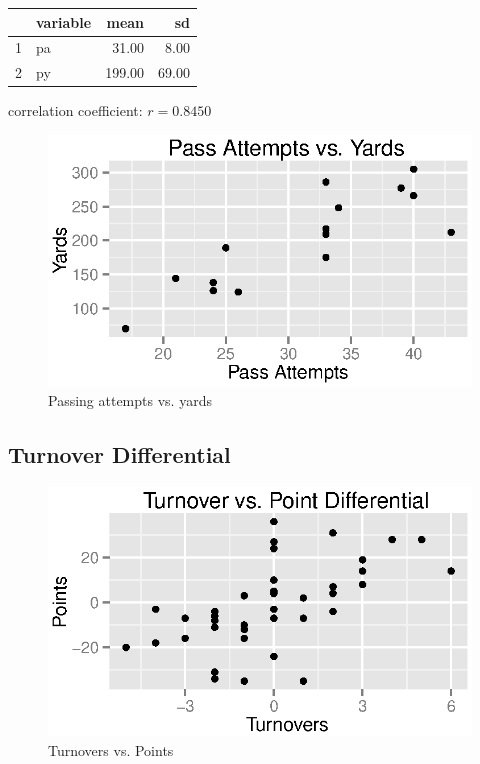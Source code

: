 \documentclass{exam}
\begin{document}
  \begin{table}[ht]
    \centering
    \begin{tabular}{rlrr}
      \toprule
        & variable & mean   & sd \\
      \midrule
      1 & pa       & 31.00  & 8.00 \\
      2 & py       & 199.00 & 69.00 \\
      \bottomrule
    \end{tabular}
  \end{table}

  correlation coefficient: $r = 0.8450$

  \begin{figure}[H]
    \centering
    \includegraphics{figures/nfl/passing_attempts_vs_yds.eps}
    \caption{Passing attempts vs. yards}
  \end{figure}

  \subsection{Turnover Differential}

  \begin{figure}[H]
    \centering
    \includegraphics{figures/nfl/to_vs_pts.eps}
    \caption{Turnovers vs. Points}
  \end{figure}
\end{document}
